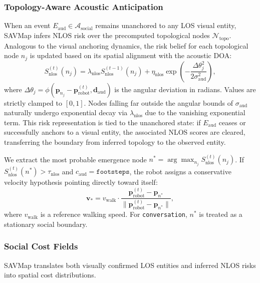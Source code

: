 \subsubsection{Topology-Aware Acoustic Anticipation}
When an event $E_{\mathrm{aud}} \in \mathcal{A}_{\mathrm{social}}$ remains unanchored to any LOS visual entity, SAVMap infers NLOS risk over the precomputed topological nodes $\mathcal{N}_{\mathrm{topo}}$. Analogous to the visual anchoring dynamics, the risk belief for each topological node $n_j$ is updated based on its spatial alignment with the acoustic DOA:
\begin{equation}
    S_{\mathrm{nlos}}^{(t)}(n_j) = \lambda_{\mathrm{nlos}} S_{\mathrm{nlos}}^{(t-1)}(n_j) + \eta_{\mathrm{nlos}} \exp\left(-\frac{\Delta\theta_j^2}{2\sigma_{\mathrm{aud}}^2}\right),
    \label{eq:nlos_score}
\end{equation}
where $\Delta\theta_j = \phi(\mathbf{p}_{n_j} - \mathbf{p}_{\mathrm{robot}}^{(t)}, \mathbf{d}_{\mathrm{aud}})$ is the angular deviation in radians. Values are strictly clamped to $[0,1]$. Nodes falling far outside the angular bounds of $\sigma_{\mathrm{aud}}$ naturally undergo exponential decay via $\lambda_{\mathrm{nlos}}$ due to the vanishing exponential term. This risk representation is tied to the unanchored state: if $E_{\mathrm{aud}}$ ceases or successfully anchors to a visual entity, the associated NLOS scores are cleared, transferring the boundary from inferred topology to the observed entity.

We extract the most probable emergence node $n^* = \arg\max_{n_j} S_{\mathrm{nlos}}^{(t)}(n_j)$. If $S_{\mathrm{nlos}}^{(t)}(n^*) > \tau_{\mathrm{nlos}}$ and $c_{\mathrm{aud}} = \texttt{footsteps}$, the robot assigns a conservative velocity hypothesis pointing directly toward itself:
\begin{equation}
    \mathbf{v}_{*} = v_{\mathrm{walk}} \cdot \frac{\mathbf{p}_{\mathrm{robot}}^{(t)} - \mathbf{p}_{n^*}}{\|\mathbf{p}_{\mathrm{robot}}^{(t)} - \mathbf{p}_{n^*}\|},
    \label{eq:vel_hyp}
\end{equation}
where $v_{\mathrm{walk}}$ is a reference walking speed. For \texttt{conversation}, $n^*$ is treated as a stationary social boundary.

\subsubsection{Social Cost Fields}
SAVMap translates both visually confirmed LOS entities and inferred NLOS risks into spatial cost distributions.

